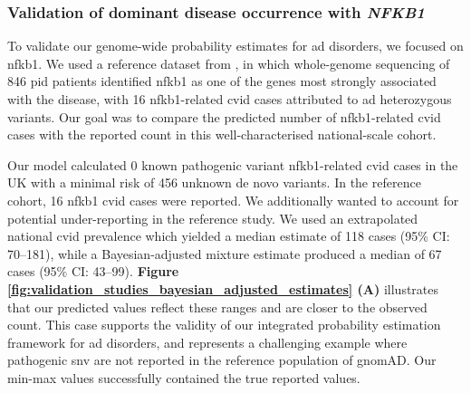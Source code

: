 \subsubsection{Validation of dominant disease occurrence with \textit{NFKB1}}

To validate our genome-wide probability estimates for \ac{ad} disorders, we focused on \ac{nfkb1}.
We used a reference dataset from \citet{tuijnenburgNFKB12018}, in which whole-genome sequencing of 846 \ac{pid} patients identified \ac{nfkb1} as one of the genes most strongly associated with the disease, with 16 \ac{nfkb1}-related \ac{cvid} cases attributed to \ac{ad} heterozygous variants. 
Our goal was to compare the predicted number of \ac{nfkb1}-related \ac{cvid} cases with the reported count in this well-characterised national-scale cohort.

Our model calculated 0 known pathogenic variant \ac{nfkb1}-related \ac{cvid} cases in the UK with a minimal risk of 456 unknown de novo variants. In the reference cohort, 16 \ac{nfkb1} \ac{cvid} cases were reported. 
We additionally wanted to account for potential under-reporting in the reference study. 
We used an extrapolated national \ac{cvid} prevalence which yielded a median estimate of 118 cases (95\% CI: 70–181), while a Bayesian-adjusted mixture estimate produced a median of 67 cases (95\% CI: 43–99). \textbf{Figure \ref{fig:validation_studies_bayesian_adjusted_estimates} (A)} illustrates that our predicted values reflect these ranges and are closer to the observed count. 
This case supports the validity of our integrated probability estimation framework for \ac{ad} disorders, and represents a challenging example where pathogenic \ac{snv} are not reported in the reference population of gnomAD. Our min-max values successfully contained the true reported values.

